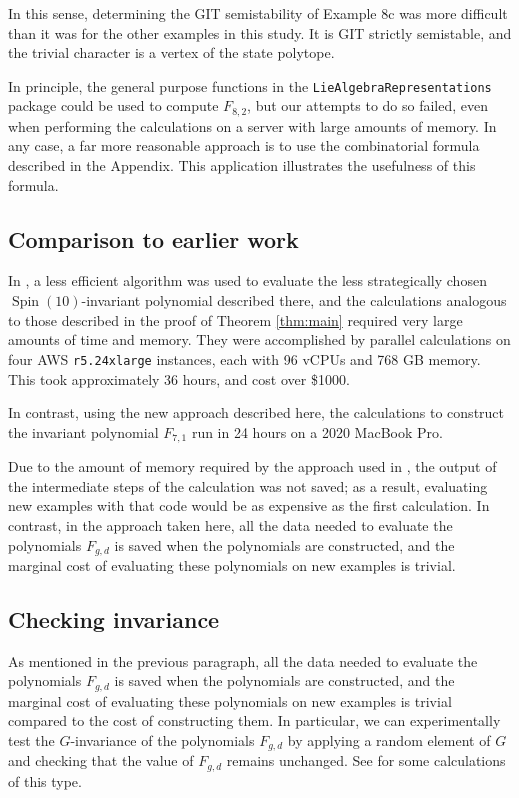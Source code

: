 \documentclass{amsart}[12pt]
\theoremstyle{definition}
\numberwithin{equation}{section}
\newcommand{\Spin}{\operatorname{Spin}}
\begin{document}
In this sense, determining the GIT semistability of Example 8c was more difficult
than it was for the other examples in this study. It is GIT strictly semistable, and the trivial character is a vertex of the state polytope. 


In principle, the general purpose functions in the
\texttt{LieAlgebraRepresentations} package could be used to compute $F_{8,2}$, but our attempts to do so
failed, even when performing the calculations on a server with large
amounts of memory. In any case, a far more reasonable approach is to
use the combinatorial formula described in the Appendix. This
application illustrates the usefulness of this formula.




\subsection{Comparison to earlier work}


In \cite{Swinarski2025}, a less efficient algorithm was used to evaluate the less strategically chosen $\Spin(10)$-invariant polynomial described there, and the calculations analogous to those described  in the proof of  
Theorem \ref{thm:main} required very large amounts of time and memory. They
were accomplished by parallel calculations on four AWS
\texttt{r5.24xlarge} instances, each with 96 vCPUs and 768 GB
memory. This took approximately 36 hours, and cost over \$1000.

In contrast, using the new approach described here, the calculations
to construct the invariant polynomial $F_{7,1}$ run in 24 
hours on a 2020 MacBook Pro. %

Due to the amount of memory required by the approach used in
\cite{Swinarski2025}, the output of the intermediate steps of the
calculation was not saved;
as a result, evaluating new examples with that code would be as expensive as the
first calculation. In contrast, in the approach taken here, all the
data needed to evaluate the polynomials $F_{g,d}$ is saved when the
polynomials are constructed, and the
marginal cost of evaluating these polynomials on new examples is
trivial. 


\subsection{Checking invariance}


As mentioned in the previous paragraph, all the
data needed to evaluate the polynomials $F_{g,d}$ is saved when the
polynomials are constructed, and the
marginal cost of evaluating these polynomials on new examples is
trivial compared to the cost of constructing them. In particular, we can experimentally test the $G$-invariance of
the polynomials $F_{g,d}$ by applying a random element of $G$ and
checking that the value of $F_{g,d}$ remains unchanged. See
\cite{Code} for some calculations of this type. 
\end{document}
